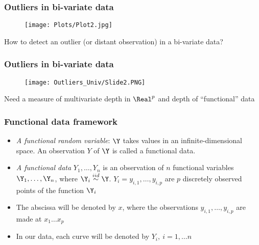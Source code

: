 \documentclass[10pt,dvipsnames,table]{beamer}
\begin{document}
\begin{frame}
\frametitle{Outliers in bi-variate data}
\vspace{-0.5cm}
\begin{figure}[t]
\centering
\texttt{[image: Plots/Plot2.jpg]}
\end{figure}
\vspace{-0.5cm}
How to detect an outlier (or distant observation) in a bi-variate data?
\end{frame}

\begin{frame}
\frametitle{Outliers in bi-variate data}
\vspace{-0.5cm}
\begin{figure}[t]
\centering
\texttt{[image: Outliers\_Univ/Slide2.PNG]}
\end{figure}
\vspace{-0.5cm}
Need a measure of multivariate depth in $\Real ^ p$ and depth of ``functional'' data
\end{frame}

\begin{frame}
\frametitle{Functional data framework}
\begin{itemize}
\item {\emph{A functional random variable}}: $\Y$ takes values in an infinite-dimensional space. An observation $Y$ of $\Y$ is called a functional data.
\item {\emph{A functional data}} $Y_1, \dots, Y_n$ is an observation of $n$ functional variables $\Y_1, \dots, \Y_n$, where $\Y_i \stackrel{iid}{\sim} \Y$. $Y_i = {y_{i,1}, \dots, y_{i,p}}$ are $p$ discretely observed points of the function $\Y_i$
\item The abscissa will be denoted by $x$, where the observations $y_{i,1}, \dots, y_{i,p}$ are made at $x_1 \dots x_p$
\item In our data, each curve will be denoted by $Y_i, \ i = 1, \dots n$
\end{itemize}
\end{frame}
\end{document}
